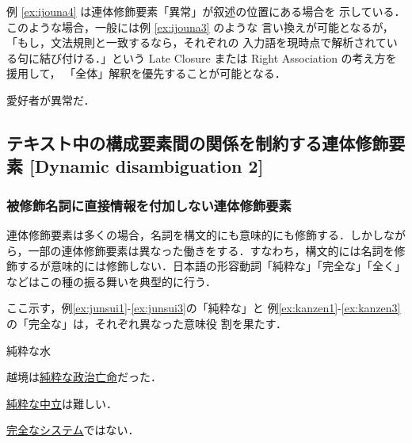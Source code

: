例 \ref{ex:ijouna4} は連体修飾要素「異常」が叙述の位置にある場合を
示している．このような場合，一般には例  \ref{ex:ijouna3} のような
言い換えが可能となるが，「もし，文法規則と一致するなら，それぞれの
入力語を現時点で解析されている句に結び付ける．」という Late Closure 
または Right Association \cite{Kimball73,Frazier79}の考え方を援用して，
「全体」解釈を優先することが可能となる．

\begin{exx}\rm
  \label{ex:ijouna4}
  \hspace*{.5cm} 愛好者が異常だ．
\end{exx}

\subsection{テキスト中の構成要素間の関係を制約する連体修飾要素
[Dynamic disambiguation 2] } 
\label{sec:Dynamic_disambiguation2}

\subsubsection{被修飾名詞に直接情報を付加しない連体修飾要素}
\label{sec:Dynamic_disambiguation2_1}

連体修飾要素は多くの場合，名詞を構文的にも意味的にも修飾する．しかしなが
ら，一部の連体修飾要素は異なった働きをする．すなわち，構文的には名詞を修
飾するが意味的には修飾しない．日本語の形容動詞「純粋な」「完全な」「全く」
などはこの種の振る舞いを典型的に行う． 

ここ示す，例\ref{ex:junsui1}-\ref{ex:junsui3}の「純粋な」と
例\ref{ex:kanzen1}-\ref{ex:kanzen3} の「完全な」は，それぞれ異なった意味役
割を果たす． 

\begin{exx}\rm
  \label{ex:junsui1}
  \hspace*{.5cm} 純粋な水
\end{exx}

\begin{exx}\rm
  \label{ex:junsui2}
  \hspace*{.5cm} 越境は\underline{純粋な政治亡命}だった．
\end{exx}

\begin{exx}\rm
  \label{ex:junsui3}
  \hspace*{.5cm} \underline{純粋な中立}は難しい．
\end{exx}

\begin{exx}\rm
  \label{ex:kanzen1}
  \hspace*{.5cm} \underline{完全なシステム}ではない．
\end{exx}

